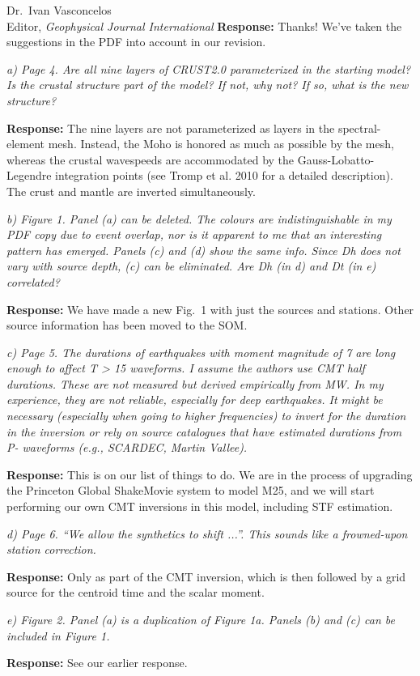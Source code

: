 \documentclass[11pt,a4paper]{letter}
\newcommand{\response}[1]{\textbf{Response:} #1}
\newcommand{\rev}[1]{{\it{#1}}}
\begin{document}
\begin{letter}{Dr.~Ivan Vasconcelos\\
Editor, \textit{Geophysical Journal International}}
\response{Thanks! We've taken the suggestions in the PDF into account in our revision.}

\rev{a) Page 4. Are all nine layers of CRUST2.0 parameterized in the starting model? Is the crustal structure part of the model? If not, why not? If so, what is the new structure?
}

\response{The nine layers are not parameterized as layers in the spectral-element mesh. Instead,
the Moho is honored as much as possible by the mesh, whereas the crustal wavespeeds are accommodated by the Gauss-Lobatto-Legendre integration points (see Tromp et al. 2010 for a detailed description). The crust and mantle are inverted simultaneously.}

\rev{b) Figure 1. Panel (a) can be deleted. The colours are indistinguishable in my PDF copy due to event overlap, nor is it apparent to me that an interesting pattern has emerged. Panels (c) and (d) show the same info. Since Dh does not vary with source depth, (c) can be eliminated. Are Dh (in d) and Dt (in e) correlated?
}

\response{We have made a new Fig.~1 with just the sources and stations. Other source information has been moved to the SOM.}

\rev{c) Page 5. The durations of earthquakes with moment magnitude of 7 are long enough to affect T > 15 waveforms. I assume the authors use CMT half durations. These are not measured but derived empirically from MW. In my experience, they are not reliable, especially for deep earthquakes. It might be necessary (especially when going to higher frequencies) to invert for the duration in the inversion or rely on source catalogues that have estimated durations from P- waveforms (e.g., SCARDEC, Martin Vallee).
}

\response{This is on our list of things to do. We are in the process of upgrading the Princeton Global ShakeMovie system to model M25, and we will start performing our own CMT inversions in this model, including STF estimation.}

\rev{d) Page 6. ``We allow the synthetics to shift ...''. This sounds like a frowned-upon station correction.
}

\response{Only as part of the CMT inversion, which is then followed by a grid source for the centroid time and the scalar moment.}

\rev{e) Figure 2. Panel (a) is a duplication of Figure 1a. Panels (b) and (c) can be included in Figure 1.
}

\response{See our earlier response.}


\end{letter}
\end{document}

